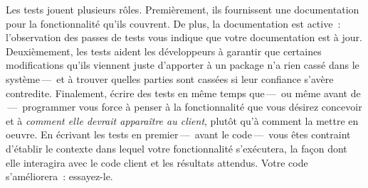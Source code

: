 \documentclass[a4paper,10pt,twoside]{book}
\begin{document}

Les tests jouent plusieurs rôles. Premièrement, ils fournissent une documentation pour la fonctionnalité qu'ils couvrent. De plus, la documentation est active~: l'observation des passes de tests vous indique que votre documentation est à jour. Deuxièmement, les tests aident les développeurs à garantir que certaines modifications qu'ils viennent juste d'apporter à un package n'a rien cassé dans le système\,---\, et à trouver quelles parties sont cassées si leur confiance s'avère contredite. Finalement, écrire des tests en même temps que\,---\, ou même avant de \,---\,  programmer vous force à penser à la fonctionnalité que vous désirez concevoir et à \emph{comment elle devrait apparaître au client}, plutôt qu'à comment la mettre en oeuvre. En écrivant les tests en premier\,---\, avant le code\,---\, vous êtes contraint d'établir le contexte dans lequel votre fonctionnalité s'exécutera, la façon dont elle interagira avec le code client et les résultats attendus. Votre code s'améliorera~: essayez-le.
 
\end{document}
